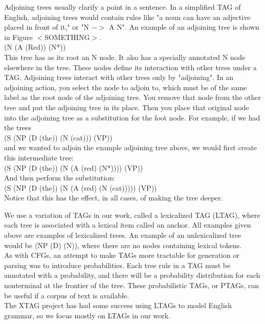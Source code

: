 Adjoining trees usually clarify a point in a sentence.  In a simplified TAG of English, adjoining
trees would contain rules like "a noun can have an adjective placed in front of it," or "N $->$ A N".
An example of an adjoining tree is shown in Figure $<$SOMETHING$>$.\\
(N (A (Red)) (N*))\\
This tree has as its root an N node.  It also has a specially annotated N node elsewhere in the
tree.  These nodes define its interaction with other trees under a TAG.  Adjoining trees interact
with other trees only by "adjoining".  In an adjoining action, you select the node
to adjoin to, which must be of the same label as the root node of the adjoining tree.  You remove
that node from the other tree and put the adjoining tree in its place.  Then
you place that original node into the adjoining tree as a substitution for the foot node.
For example, if we had the trees\\
(S (NP (D (the)) (N (cat))) (VP))\\
and we wanted to adjoin the example adjoining tree above, we would first create this intermediate tree:\\
(S (NP (D (the)) (N (A (red) (N*)))) (VP))\\
And then perform the substitution:\\
(S (NP (D (the)) (N (A (red) (N (cat))))) (VP))\\
Notice that this has the effect, in all cases, of making the tree deeper.

We use a variation of TAGs in our work, called a lexicalized TAG (LTAG), where each tree is
associated with a lexical item called an anchor.  All examples given above are examples of
lexicalized trees.  An example of an unlexicalized tree would be (NP (D) (N)), where there
are no nodes containing lexical tokens.\\

As with CFGs, an attempt to make TAGs more tractable for generation or parsing was to
introduce probabilities.  Each tree rule in a TAG must be annotated with a probability, and
there will be a probability distribution for each nonterminal at the frontier of the tree.
These probabilistic TAGs, or PTAGs, can be useful if a corpus of text is available.\\

The XTAG project has had some success using LTAGs to model English grammar, 
so we focus mostly on LTAGs in our work.